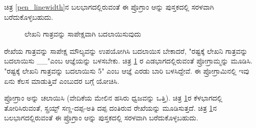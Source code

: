ಚಿತ್ರ \ref{pen_linewidth}ನ ಬಲಭಾಗದಲ್ಲಿರುವಂತೆ  ಈ ಪ್ರೊಗ್ರಾಂ ಆನ್ನು ಪುಸ್ತಕದಲ್ಲಿ  ಸರಳವಾಗಿ ಬರೆದುಕೊಳ್ಳಬಹುದು.  

\begin{figure}[h]
\begin{center}
\begin{multicols}{2}
\begin{Scratch}[1]
\beginbox{}
\end{Scratch}


\end{multicols}

\end{center}
\caption{ಲೇಖನಿ ಗಾತ್ರವನ್ನು ಸಾಪೇಕ್ಷವಾಗಿ ಬದಲಾಯಿಸುವುದು}
\label{pensize}
\end{figure}

ರೇಖೆಯ ಗಾತ್ರವನ್ನು ಸಾಪೇಕ್ಷ ಮೌಲ್ಯವನ್ನು ಉಪಯೋಗಿಸಿ ಬದಲಾಯಿಸ ಬೇಕಾದರೆ,  "ರಷ್ಟಕ್ಕೆ ಲೇಖನಿ ಗಾತ್ರವನ್ನು ಬದಲಾಯಿಸು \_\_"ಎಂಬ 
ಆಜ್ಞೆಯನ್ನು ಬಳಸಬೇಕು.  ಚಿತ್ರ \ref{pensize} ರ ಎಡಭಾಗದಲ್ಲಿರುವಂತೆ ಪ್ರೋಗ್ರಾಮ್ಮನ್ನು ಮೂಡಿಸಿ.  "ರಷ್ಟಕ್ಕೆ ಲೇಖನಿ ಗಾತ್ರವನ್ನು ಬದಲಾಯಿಸು 5" ಎಂಬ  ಆಜ್ಞೆ ಎರಡು ಬಾರಿ ಬಳಸಿದ್ದೇವೆ.  ಈ ಪ್ರೋಗ್ರಾಮಿನಲ್ಲಿ ಇವು ಏನು ಕೆಲಸ ಮಾಡುತ್ತಿವೆ ಎಂಬುದರ ಬಗ್ಗೆ ಯೋಚಿಸಿ.  

ಪ್ರೋಗ್ರಾಂ ಅನ್ನು  ಚಲಾಯಿಸಿ (ವೇದಿಕೆಯ ಮೇಲಿನ ಹಸಿರು ಧ್ವಜವನ್ನು ಒತ್ತಿ).  ಚಿತ್ರ \ref{pensize}ರ ಕೆಳಭಾಗದಲ್ಲಿ ತೋರಿಸಿರುವಂತೆ, ಸ್ಪ್ರಯ್ಟ್ ಸಣ್ಣ-ದಪ್ಪ-ಅತಿ ದಪ್ಪ ದಂತಿರುವ ರೇಖೆಯನ್ನು ಮೂಡಿಸುತ್ತದೆ.  ಚಿತ್ರ \ref{pensize}ನ ಬಲಭಾಗದಲ್ಲಿರುವಂತೆ  ಈ ಪ್ರೊಗ್ರಾಂ ಆನ್ನು ಪುಸ್ತಕದಲ್ಲಿ  ಸರಳವಾಗಿ ಬರೆದುಕೊಳ್ಳಬಹುದು.  

